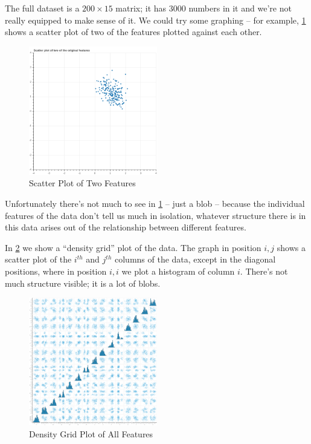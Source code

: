 \documentclass[
]{article}
\begin{document}
The full dataset is a \(200\times 15\) matrix; it has \(3000\) numbers
in it and we're not really equipped to make sense of it. We could try
some graphing -- for example, \cref{fig:features} shows a scatter plot
of two of the features plotted against each other.

\begin{figure}
\hypertarget{fig:features}{%
\centering
\includegraphics[width=0.5\textwidth,height=\textheight]{../img/features.png}
\caption{Scatter Plot of Two Features}\label{fig:features}
}
\end{figure}

Unfortunately there's not much to see in \cref{fig:features} -- just a
blob -- because the individual features of the data don't tell us much
in isolation, whatever structure there is in this data arises out of the
relationship between different features.

In \cref{fig:densitygrid} we show a ``density grid'' plot of the data.
The graph in position \(i,j\) shows a scatter plot of the \(i^{th}\) and
\(j^{th}\) columns of the data, except in the diagonal positions, where
in position \(i,i\) we plot a histogram of column \(i\). There's not
much structure visible; it is a lot of blobs.

\begin{figure}
\hypertarget{fig:densitygrid}{%
\centering
\includegraphics[width=0.5\textwidth,height=\textheight]{../img/density.png}
\caption{Density Grid Plot of All Features}\label{fig:densitygrid}
}
\end{figure}
\end{document}
